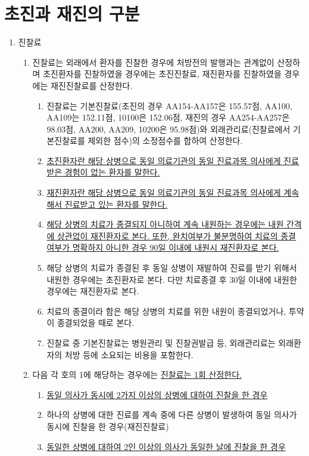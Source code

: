 \section{초진과 재진의 구분}
\begin{enumerate}[1.]\tightlist
\item 진찰료
	\begin{enumerate}[가.]\tightlist
	\item 진찰료는 외래에서 환자를 진찰한 경우에 처방전의 발행과는 관계없이 산정하며 초진환자를 진찰하였을 경우에는 초진진찰료, 재진환자를 진찰하였을 경우에는 재진진찰료를 산정한다.
		\begin{enumerate}[(1)]\tightlist
		\item 진찰료는 기본진찰료(초진의 경우 AA154-AA157은 155.57점, AA100, AA109는 152.11점, 10100은 152.06점, 재진의 경우 AA254-AA257은 98.03점, AA200, AA209, 10200은 95.98점)와
외래관리료(진찰료에서 기본진찰료를 제외한 점수)의 소정점수를 합하여 산정한다.
		\item \uline{초진환자란 해당 상병으로 동일 의료기관의 동일 진료과목 의사에게 진료받은 경험이 없는 환자를 말한다.}
		\item \uline{재진환자란 해당 상병으로 동일 의료기관의 동일 진료과목 의사에게 계속해서 진료받고 있는 환자를 말한다.}
		\item \uline{해당 상병의 치료가 종결되지 아니하여 계속 내원하는 경우에는 내원 간격에 상관없이 재진환자로 본다. 또한, 완치여부가 불분명하여 치료의 종결 여부가 명확하지 아니한 경우 90일 이내에 내원시 재진환자로 본다.}
		\item 해당 상병의 치료가 종결된 후 동일 상병이 재발하여 진료를 받기 위해서 내원한 경우에는 초진환자로 본다. 다만 치료종결 후 30일 이내에 내원한 경우에는 재진환자로 본다.
		\item 치료의 종결이라 함은 해당 상병의 치료를 위한 내원이 종결되었거나, 투약이 종결되었을 때로 본다.
		\item 진찰료 중 기본진찰료는 병원관리 및 진찰권발급 등, 외래관리료는 외래환자의 처방 등에 소요되는 비용을 포함한다.
		\end{enumerate}
	\item 다음 각 호의 1에 해당하는 경우에는 \uline{진찰료는 1회 산정한다.}
		\begin{enumerate}[(1)]\tightlist
		\item \uline{동일 의사가 동시에 2가지 이상의 상병에 대하여 진찰을 한 경우}
		\item 하나의 상병에 대한 진료를 계속 중에 다른 상병이 발생하여 동일 의사가 동시에 진찰을 한 경우(재진진찰료)
		\item \uline{동일한 상병에 대하여 2인 이상의 의사가 동일한 날에 진찰을 한 경우}

\end{enumerate}
\end{enumerate}
\end{enumerate}
